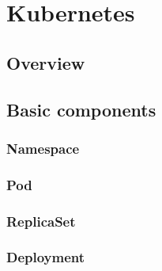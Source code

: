 \section{Kubernetes}

\subsection{Overview}

\subsection{Basic components}

\subsubsection{Namespace}

\subsubsection{Pod}

\subsubsection{ReplicaSet}

\subsubsection{Deployment}

